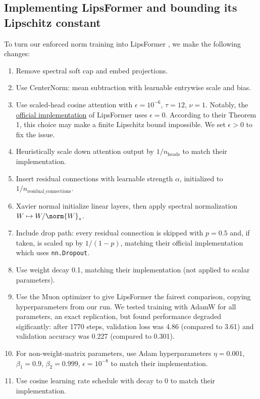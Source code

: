 
\subsection{Implementing LipsFormer and bounding its Lipschitz constant}

To turn our enforced norm training into LipsFormer \citep{qi2023lipsformer}, we make the following changes:

\begin{enumerate}
    \item Remove spectral soft cap and embed projections.
    \item Use CenterNorm: mean subtraction with learnable entrywise scale and bias.
    \item Use scaled-head cosine attention with $\epsilon = 10^{-6}$, $\tau = 12$, $\nu = 1$. Notably, the \href{https://github.com/IDEA-Research/LipsFormer/blob/main/models/lipsformer_swin.py#L205-L206}{official implementation} of LipsFormer uses $\epsilon = 0$. According to their Theorem 1, this choice may make a finite Lipschitz bound impossible. We set $\epsilon > 0$ to fix the issue.
    \item Heuristically scale down attention output by $1/n_\text{heads}$ to match their implementation.
    \item Insert residual connections with learnable strength $\alpha$, initialized to $1/n_\text{residual\_connections}$.
    \item Xavier normal initialize linear layers, then apply spectral normalization $W \mapsto W / \norm{W}_\ast$.
    \item Include drop path: every residual connection is skipped with $p=0.5$ and, if taken, is scaled up by $1/(1-p)$, matching their official implementation which uses \verb|nn.Dropout|.
    \item Use weight decay 0.1, matching their implementation (not applied to scalar parameters).
    \item Use the Muon optimizer to give LipsFormer the fairest comparison, copying hyperparameters from our run. We tested training with AdamW for all parameters, an exact replication, but found performance degraded sigificantly: after 1770 steps, validation loss was 4.86 (compared to 3.61) and validation accuracy was 0.227 (compared to 0.301).
    \item For non-weight-matrix parameters, use Adam hyperparameters $\eta = 0.001$, $\beta_1 = 0.9$, $\beta_2 = 0.999$, $\epsilon = 10^{-8}$ to match their implementation.
    \item Use cosine learning rate schedule with decay to 0 to match their implementation.
\end{enumerate}


